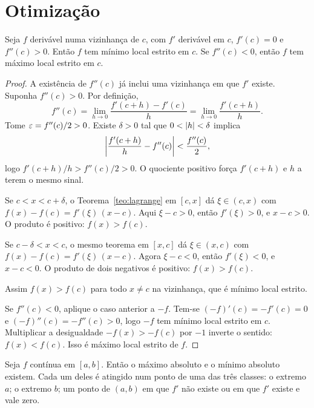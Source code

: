 \documentclass[11pt,a4paper]{article}
\begin{document}

\section{Otimização}

\begin{teorema}\label{teo:segunda}
Seja $f$ derivável numa vizinhança de $c$, com $f'$ derivável em $c$, $f'(c)=0$ e $f''(c)>0$. Então $f$ tem mínimo local estrito em $c$. Se $f''(c)<0$, então $f$ tem máximo local estrito em $c$.
\end{teorema}

\begin{proof}
A existência de $f''(c)$ já inclui uma vizinhança em que $f'$ existe. Suponha $f''(c)>0$. Por definição,
\[
f''(c)=\lim_{h\to 0}\frac{f'(c+h)-f'(c)}{h}=\lim_{h\to 0}\frac{f'(c+h)}{h}.
\]
Tome $\varepsilon=f''(c)/2>0$. Existe $\delta>0$ tal que $0<\left\lvert h \right\rvert<\delta$ implica
\[
\left\lvert \frac{f'(c+h)}{h}-f''(c) \right\rvert<\frac{f''(c)}{2},
\]
logo $f'(c+h)/h>f''(c)/2>0$. O quociente positivo força $f'(c+h)$ e $h$ a terem o mesmo sinal.

Se $c<x<c+\delta$, o Teorema~\ref{teo:lagrange} em $[c,x]$ dá $\xi\in(c,x)$ com $f(x)-f(c)=f'(\xi)\,(x-c)$. Aqui $\xi-c>0$, então $f'(\xi)>0$, e $x-c>0$. O produto é positivo: $f(x)>f(c)$.

Se $c-\delta<x<c$, o mesmo teorema em $[x,c]$ dá $\xi\in(x,c)$ com $f(x)-f(c)=f'(\xi)\,(x-c)$. Agora $\xi-c<0$, então $f'(\xi)<0$, e $x-c<0$. O produto de dois negativos é positivo: $f(x)>f(c)$.

Assim $f(x)>f(c)$ para todo $x\neq c$ na vizinhança, que é mínimo local estrito.

Se $f''(c)<0$, aplique o caso anterior a $-f$. Tem-se $(-f)'(c)=-f'(c)=0$ e $(-f)''(c)=-f''(c)>0$, logo $-f$ tem mínimo local estrito em $c$. Multiplicar a desigualdade $-f(x)>-f(c)$ por $-1$ inverte o sentido: $f(x)<f(c)$. Isso é máximo local estrito de $f$.
\end{proof}

\begin{teorema}\label{teo:candidatos}
Seja $f$ contínua em $[a,b]$. Então o máximo absoluto e o mínimo absoluto existem. Cada um deles é atingido num ponto de uma das três classes: o extremo $a$; o extremo $b$; um ponto de $(a,b)$ em que $f'$ não existe ou em que $f'$ existe e vale zero.
\end{teorema}
\end{document}
